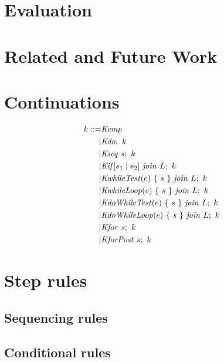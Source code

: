 \documentclass[acmsmall,review,anonymous]{acmart}\settopmatter{printfolios=true,printccs=false,printacmref=false}
\begin{document}
\section{Evaluation}
\label{sec:evaluation}

\section{Related and Future Work}
\label{sec:relwork}



\appendix

\section{Continuations}
\label{app:continuations}

\[\begin{split}
k ::= & \mathit{Kemp} \\
| & \mathit{Kdo};~ k \\
| & \mathit{Kseq} ~ s; ~ k \\
| & \mathit{Kif}[s_1 \mid s_2] ~ \mathit{join} ~ L; ~ k \\
| & \mathit{KwhileTest}(e) ~ \{ ~ s ~ \} ~ \mathit{join} ~ L; ~ k \\
| & \mathit{KwhileLoop}(e) ~ \{ ~ s ~ \} ~ \mathit{join} ~ L; ~ k \\
| & \mathit{KdoWhileTest}(e) ~ \{ ~ s ~ \} ~ \mathit{join} ~ L; ~ k \\
| & \mathit{KdoWhileLoop}(e) ~ \{ ~ s ~ \} ~ \mathit{join} ~ L; ~ k \\
| & \mathit{Kfor} ~ s; ~ k \\
| & \mathit{KforPost} ~ s; ~ k \\
\end{split}\]

\section{Step rules}
\label{app:rules}

\subsection{Sequencing rules}

\dostepa
\dostepb
\seqstep
\seqskipstep
\seqcontinuestep
\seqbreakstep
\retvalstep
{}

\subsection{Conditional rules}
\end{document}
